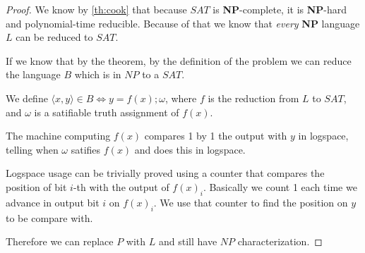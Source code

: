 \documentclass[12pt, a4paper]{article}
\begin{document}
 \begin{proof}
   We know by \ref{th:cook} that because $SAT$ is \textbf{NP}-complete, it is \textbf{NP}-hard and polynomial-time reducible. Because of that we know that \textit{every} \textbf{NP} language $L$ can be reduced to $SAT$.

   If we know that by the theorem, by the definition of the problem we can reduce the language $B$ which is in $NP$ to a $SAT$.

   We define $\langle x,y \rangle \in B \iff y=f(x);\omega$, where $f$ is the reduction from $L$ to $SAT$, and $\omega$ is a satifiable truth assignment of $f(x)$.

   The machine computing $f(x)$ compares 1 by 1 the output with $y$ in logspace, telling when $\omega$ satifies $f(x)$ and does this in logspace.

   Logspace usage can be trivially proved using a counter that compares the position of bit $i$-th with the output of $f(x)_i$. Basically we count 1 each time we advance in output bit $i$ on $f(x)_i$. We use that counter to find the position on $y$ to be compare with.

   Therefore we can replace $P$ with $L$ and still have $NP$ characterization.
 \end{proof}
\end{document}
